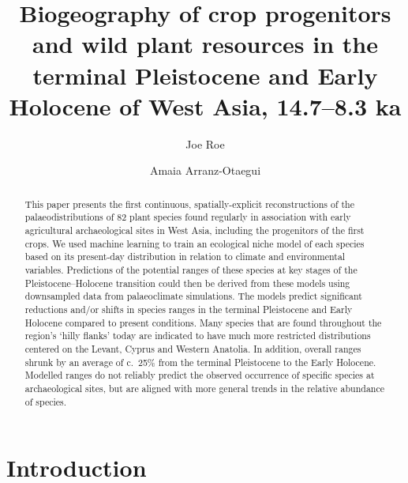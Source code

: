 \documentclass[
  authoryear,
  preprint]{elsarticle}
\begin{document}
\begin{frontmatter}
\title{Biogeography of crop progenitors and wild plant resources in the
terminal Pleistocene and Early Holocene of West Asia, 14.7--8.3 ka}
\author[1,2]{Joe Roe%
%
}
\author[3]{Amaia Arranz-Otaegui%
%
}





        
\begin{abstract}
This paper presents the first continuous, spatially-explicit
reconstructions of the palaeodistributions of 82 plant species found
regularly in association with early agricultural archaeological sites in
West Asia, including the progenitors of the first crops. We used machine
learning to train an ecological niche model of each species based on its
present-day distribution in relation to climate and environmental
variables. Predictions of the potential ranges of these species at key
stages of the Pleistocene--Holocene transition could then be derived
from these models using downsampled data from palaeoclimate simulations.
The models predict significant reductions and/or shifts in species
ranges in the terminal Pleistocene and Early Holocene compared to
present conditions. Many species that are found throughout the region's
`hilly flanks' today are indicated to have much more restricted
distributions centered on the Levant, Cyprus and Western Anatolia. In
addition, overall ranges shrunk by an average of c.~25\% from the
terminal Pleistocene to the Early Holocene. Modelled ranges do not
reliably predict the observed occurrence of specific species at
archaeological sites, but are aligned with more general trends in the
relative abundance of species.
\end{abstract}





\end{frontmatter}
    

\section{Introduction}\label{introduction}
\end{document}
